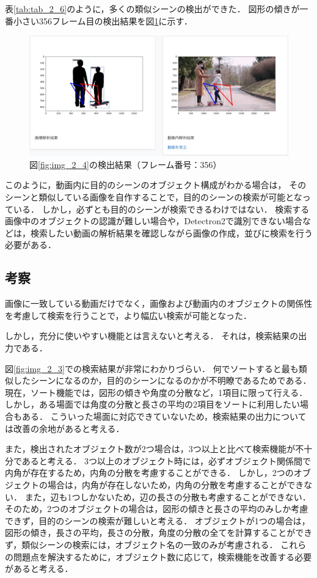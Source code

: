 \documentclass[a4j,12pt,dvipdfmx]{jreport}
\begin{document}
表\ref{tab:tab_2_6}のように，多くの類似シーンの検出ができた．
図形の傾きが一番小さい356フレーム目の検出結果を図\ref{fig:img_2_4_3}に示す．
\begin{figure}[t]
  \centering
  \includegraphics[width=13cm]{image/result_2_4_3.jpg}
  \caption{図\ref{fig:img_2_4}の検出結果（フレーム番号：356）}
  \label{fig:img_2_4_3}
\end{figure}

このように，動画内に目的のシーンのオブジェクト構成がわかる場合は，
そのシーンと類似している画像を自作することで，目的のシーンの検索が可能となっている．
しかし，必ずとも目的のシーンが検索できるわけではない．
検索する画像中のオブジェクトの認識が難しい場合や，Detectron2で識別できない場合などは，検索したい動画の解析結果を確認しながら画像の作成，並びに検索を行う必要がある．

\subsection{考察}\label{chap4-3-1}
画像に一致している動画だけでなく，画像および動画内のオブジェクトの関係性を考慮して検索を行うことで，より幅広い検索が可能となった．

しかし，充分に使いやすい機能とは言えないと考える．
それは，検索結果の出力である．

図\ref{fig:img_2_3}での検索結果が非常にわかりづらい．
何でソートすると最も類似したシーンになるのか，目的のシーンになるのかが不明瞭であるためである．
現在，ソート機能では，図形の傾きや角度の分散など，1項目に限って行える．
しかし，ある場面では角度の分散と長さの平均の2項目をソートに利用したい場合もある．
こういった場面に対応できていないため，検索結果の出力については改善の余地があると考える．

また，検出されたオブジェクト数が2つ場合は，3つ以上と比べて検索機能が不十分であると考える．
3つ以上のオブジェクト時には，必ずオブジェクト関係間で内角が存在するため，内角の分散を考慮することができる．
しかし，2つのオブジェクトの場合は，内角が存在しないため，内角の分散を考慮することができない．
また，辺も1つしかないため，辺の長さの分散も考慮することができない．
そのため，2つのオブジェクトの場合は，図形の傾きと長さの平均のみしか考慮できず，目的のシーンの検索が難しいと考える．
オブジェクトが1つの場合は，図形の傾き，長さの平均，長さの分散，角度の分散の全てを計算することができず，類似シーンの検索には，オブジェクト名の一致のみが考慮される．
これらの問題点を解決するために，オブジェクト数に応じて，検索機能を改善する必要があると考える．
\end{document}

